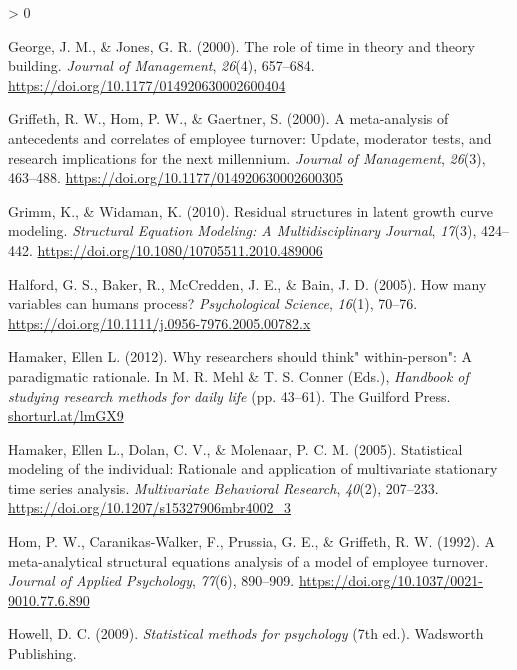 \documentclass[
12pt, %
twoside,
english]{guelphthesis}
\newlength{\cslhangindent}
\newenvironment{CSLReferences}[2] %
 {%
  \setlength{\parindent}{0pt}
  \ifodd #1 \everypar{\setlength{\hangindent}{\cslhangindent}}\ignorespaces\fi
  \ifnum #2 > 0
  \setlength{\parskip}{\linespacing{2}}
  \fi
 }%
 {}
\theoremstyle{definition}
\theoremstyle{definition}
\theoremstyle{definition}
\theoremstyle{definition}
\theoremstyle{remark}
\begin{document}
\begin{CSLReferences}{1}{0}
\leavevmode{}%
George, J. M., \& Jones, G. R. (2000). The role of time in theory and theory building. \emph{Journal of Management}, \emph{26}(4), 657--684. \url{https://doi.org/10.1177/014920630002600404}

\leavevmode{}%
Griffeth, R. W., Hom, P. W., \& Gaertner, S. (2000). A meta-analysis of antecedents and correlates of employee turnover: Update, moderator tests, and research implications for the next millennium. \emph{Journal of Management}, \emph{26}(3), 463--488. \url{https://doi.org/10.1177/014920630002600305}

\leavevmode{}%
Grimm, K., \& Widaman, K. (2010). Residual structures in latent growth curve modeling. \emph{Structural Equation Modeling: A Multidisciplinary Journal}, \emph{17}(3), 424--442. \url{https://doi.org/10.1080/10705511.2010.489006}

\leavevmode{}%
Halford, G. S., Baker, R., McCredden, J. E., \& Bain, J. D. (2005). How many variables can humans process? \emph{Psychological Science}, \emph{16}(1), 70--76. \url{https://doi.org/10.1111/j.0956-7976.2005.00782.x}

\leavevmode{}%
Hamaker, Ellen L. (2012). Why researchers should think" within-person": A paradigmatic rationale. In M. R. Mehl \& T. S. Conner (Eds.), \emph{Handbook of studying research methods for daily life} (pp. 43--61). The Guilford Press. \href{https://shorturl.at/lmGX9}{shorturl.at/lmGX9}

\leavevmode{}%
Hamaker, Ellen L., Dolan, C. V., \& Molenaar, P. C. M. (2005). Statistical modeling of the individual: Rationale and application of multivariate stationary time series analysis. \emph{Multivariate Behavioral Research}, \emph{40}(2), 207--233. \url{https://doi.org/10.1207/s15327906mbr4002_3}

\leavevmode{}%
Hom, P. W., Caranikas-Walker, F., Prussia, G. E., \& Griffeth, R. W. (1992). A meta-analytical structural equations analysis of a model of employee turnover. \emph{Journal of Applied Psychology}, \emph{77}(6), 890--909. \url{https://doi.org/10.1037/0021-9010.77.6.890}

\leavevmode{}%
Howell, D. C. (2009). \emph{Statistical methods for psychology} (7th ed.). Wadsworth Publishing.


\end{CSLReferences}
\end{document}
